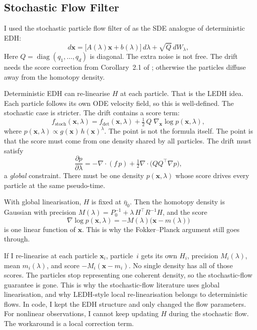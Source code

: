 \documentclass{article}
\renewcommand{\v}[1]{ \ensuremath{ {\mathbf{#1}} }}
\begin{document}
\subsection{Stochastic Flow Filter}

I used the stochastic particle flow filter of \cite{dai-new-2021} as the SDE analogue of deterministic EDH:
\[
  d\v{x} = \bigl[A(\lambda)\v{x} + b(\lambda)\bigr]\,d\lambda + \sqrt{Q}\,dW_\lambda,
\]
Here $Q = \operatorname{diag}(q_1,\ldots,q_d)$ is diagonal. The extra noise is not free. The drift needs the score correction from Corollary~2.1 of \cite{dai-new-2021}; otherwise the particles diffuse away from the homotopy density.

Deterministic EDH can re-linearise $H$ at each particle. That is the LEDH idea. Each particle follows its own ODE velocity field, so this is well-defined. The stochastic case is stricter. The drift contains a score term:
\[
  f_{\mathrm{stoch}}(\v{x},\lambda)
  = f_{\mathrm{det}}(\v{x},\lambda)
    + \tfrac{1}{2}\,Q\;\nabla_{\v{x}} \log p(\v{x},\lambda),
\]
where $p(\v{x},\lambda) \propto g(\v{x})\,h(\v{x})^{\lambda}$. The point is not the formula itself. The point is that the score must come from one density shared by all particles. The drift must satisfy
\[
  \frac{\partial p}{\partial\lambda}
  = -\nabla\!\cdot\!(f\,p) + \tfrac{1}{2}\nabla\!\cdot\!\bigl(QQ^\top \nabla p\bigr),
\]
a \emph{global} constraint. There must be one density $p(\v{x},\lambda)$ whose score drives every particle at the same pseudo-time.

With global linearisation, $H$ is fixed at $\bar\eta_0$. Then the homotopy density is Gaussian with precision $M(\lambda) = P_0^{-1} + \lambda\,H^\top R^{-1}H$, and the score
\[
  \nabla\log p(\v{x},\lambda) = -M(\lambda)\bigl(\v{x} - m(\lambda)\bigr)
\]
is one linear function of $\v{x}$. This is why the Fokker--Planck argument still goes through.

If I re-linearise at each particle $\v{x}_i$, particle~$i$ gets its own $H_i$, precision $M_i(\lambda)$, mean $m_i(\lambda)$, and score $-M_i(\v{x} - m_i)$. No single density has all of those scores. The particles stop representing one coherent density, so the stochastic-flow guarantee is gone. This is why the stochastic-flow literature uses global linearisation, and why LEDH-style local re-linearisation belongs to deterministic flows. In code, I kept the EDH structure and only changed the flow parameters. For nonlinear observations, I cannot keep updating $H$ during the stochastic flow. The workaround is a local correction term.
\end{document}
